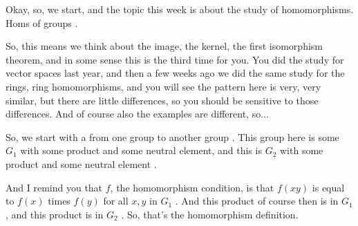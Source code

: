 \begin{speech}[00:00:00 - 00:01:15]
Okay, so, we start, and the topic this week is about the study of homomorphisms. Homs of groups .

So, this means we think about the image, the kernel, the first isomorphism theorem, and in some sense this is the third time for you. You did the study for vector spaces last year, and then a few weeks ago we did the same study for the rings, ring homomorphisms, and you will see the pattern here is very, very similar, but there are little differences, so you should be sensitive to those differences. And of course also the examples are different, so...

So, we start with a  from one group to another group . This group here is some $G_1$ with some product and some neutral element, and this is $G_2$ with some product and some neutral element .

And I remind you that $f$, the homomorphism condition, is that $f(xy)$ is equal to $f(x)$ times $f(y)$ for all $x, y$ in $G_1$ . And this product of course then is in $G_1$ , and this product is in $G_2$ . So, that's the homomorphism definition.
\end{speech}

\begin{content}

\end{content}

